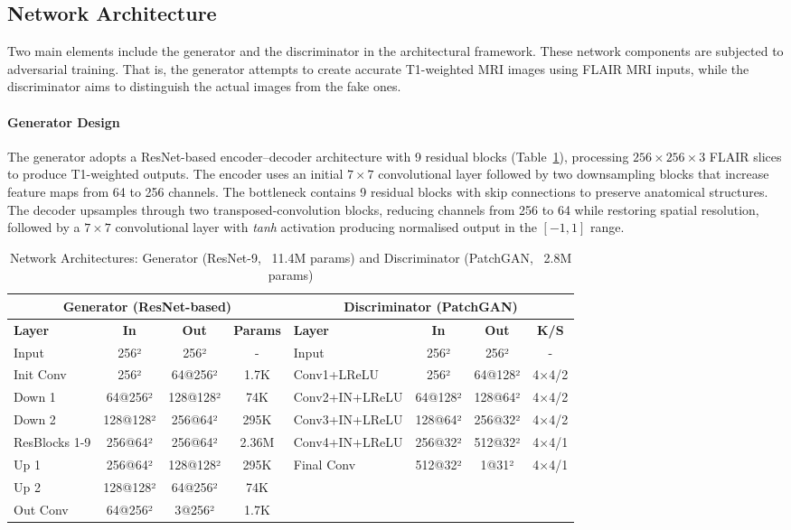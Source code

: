 \documentclass[runningheads]{llncs}
\begin{document}
\subsection{Network Architecture}

Two main elements include the generator and the discriminator in the architectural framework. These network components are subjected to adversarial training. That is, the generator attempts to create accurate T1-weighted MRI images using FLAIR MRI inputs, while the discriminator aims to distinguish the actual images from the fake ones.

\paragraph{Generator Design}

The generator adopts a ResNet-based encoder--decoder architecture with 9 residual blocks (Table~\ref{tab:architectures}), processing $256 \times 256 \times 3$ FLAIR slices to produce T1-weighted outputs. The encoder uses an initial $7 \times 7$ convolutional layer followed by two downsampling blocks that increase feature maps from 64 to 256 channels. The bottleneck contains 9 residual blocks with skip connections to preserve anatomical structures. The decoder upsamples through two transposed-convolution blocks, reducing channels from 256 to 64 while restoring spatial resolution, followed by a $7 \times 7$ convolutional layer with \textit{tanh} activation producing normalised output in the $[-1, 1]$ range.

\begin{table}[h!]
\centering
\footnotesize
\caption{Network Architectures: Generator (ResNet-9, ~11.4M params) and Discriminator (PatchGAN, ~2.8M params)}
\label{tab:architectures}
\begin{tabular}{|l|c|c|c||l|c|c|c|}
\hline
\multicolumn{4}{|c||}{\textbf{Generator (ResNet-based)}} & \multicolumn{4}{c|}{\textbf{Discriminator (PatchGAN)}} \\ \hline
\textbf{Layer} & \textbf{In} & \textbf{Out} & \textbf{Params} & \textbf{Layer} & \textbf{In} & \textbf{Out} & \textbf{K/S} \\ \hline
Input & 256² & 256² & - & Input & 256² & 256² & - \\ \hline
Init Conv & 256² & 64@256² & 1.7K & Conv1+LReLU & 256² & 64@128² & 4×4/2 \\ \hline
Down 1 & 64@256² & 128@128² & 74K & Conv2+IN+LReLU & 64@128² & 128@64² & 4×4/2 \\ \hline
Down 2 & 128@128² & 256@64² & 295K & Conv3+IN+LReLU & 128@64² & 256@32² & 4×4/2 \\ \hline
ResBlocks 1-9 & 256@64² & 256@64² & 2.36M & Conv4+IN+LReLU & 256@32² & 512@32² & 4×4/1 \\ \hline
Up 1 & 256@64² & 128@128² & 295K & Final Conv & 512@32² & 1@31² & 4×4/1 \\ \hline
Up 2 & 128@128² & 64@256² & 74K & & & & \\ \hline
Out Conv & 64@256² & 3@256² & 1.7K & & & & \\ \hline
\end{tabular}
\end{table}
\end{document}

